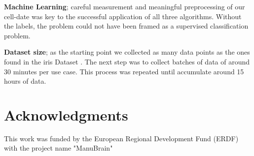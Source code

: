 \documentclass[5p,times,procedia]{elsarticle}
\begin{document}
\textbf{Machine Learning}; careful measurement and  meaningful preprocessing
of our cell-date was key to the successful application of all three algorithms.
Without the labels, the problem could not have been framed as a supervised 
classification problem.

\textbf{Dataset size}; as the starting point we collected as many data points as the ones found in the iris Dataset \cite{fisher_1936}. The next step was to collect batches of data of around 30 minutes per use case. This process was repeated until accumulate around 15 hours of data.

\section*{Acknowledgments}
This work was funded by the European Regional Development Fund (ERDF) with the project name "ManuBrain" 


\end{document}

